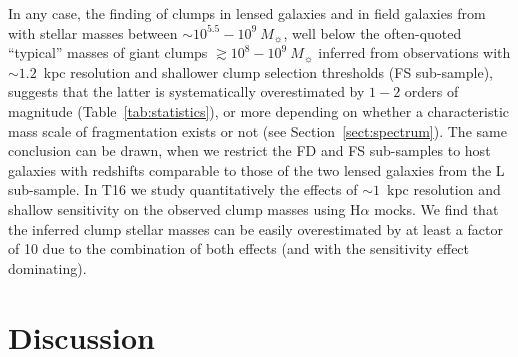 \documentclass[twocolumn]{aastex61}
\begin{document}
In any case, the finding of clumps in lensed galaxies and in field galaxies from 
\citet{elmegreen13} with stellar masses between $\sim 10^{5.5}-10^9~M_{\sun}$, 
well below the often-quoted ``typical'' masses of giant clumps 
$\gtrsim 10^8-10^9~M_{\sun}$ inferred from observations with $\sim 1.2$~kpc 
resolution and shallower clump selection thresholds (FS sub-sample), suggests 
that the latter is systematically overestimated 
by $1-2$ orders of magnitude (Table~\ref{tab:statistics}), or more depending on 
whether a characteristic mass scale of fragmentation exists or not (see 
Section~\ref{sect:spectrum}). The same conclusion can be drawn, when we restrict 
the FD and FS sub-samples to host galaxies with redshifts comparable to those of 
the two lensed galaxies from the L sub-sample.
In T16 we study quantitatively the effects of $\sim 1$~kpc resolution and 
shallow sensitivity on the observed clump masses using H$\alpha$ mocks. 
We find that the inferred clump stellar masses can be easily overestimated by at 
least a factor of 10 due to the combination of both effects (and with the 
sensitivity effect dominating). 

%

\section{Discussion}
\label{sect:discussion}

\end{document}
